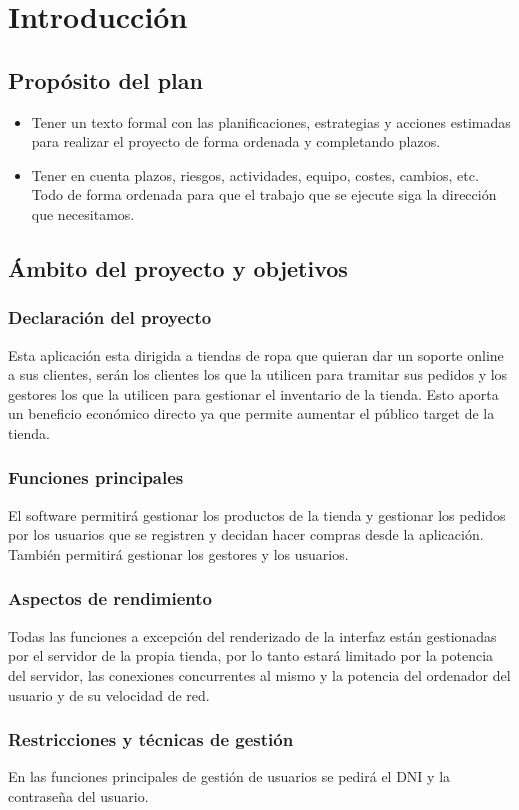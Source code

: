 \section{Introducción}
\subsection{Propósito del plan}
\begin{itemize}
	\item Tener un texto formal con las planificaciones, estrategias y acciones estimadas para realizar el proyecto de forma ordenada y completando plazos.
	\item Tener en cuenta plazos, riesgos, actividades, equipo, costes, cambios, etc. Todo de forma ordenada para que el trabajo que se ejecute siga la dirección que necesitamos.
\end{itemize}

\subsection{Ámbito del proyecto y objetivos}
\subsubsection{Declaración del proyecto}
Esta aplicación esta dirigida a tiendas de ropa que quieran dar un soporte online a sus clientes, serán los clientes los que la utilicen para tramitar sus pedidos y los gestores los que la utilicen para gestionar el inventario de la tienda. Esto aporta un beneficio económico directo ya que permite aumentar el público target de la tienda.
\subsubsection{Funciones principales}
El software permitirá gestionar los productos de la tienda y gestionar los pedidos por los usuarios que se registren y decidan hacer compras desde la aplicación. También permitirá gestionar los gestores y los usuarios.
\subsubsection{Aspectos de rendimiento}
Todas las funciones a excepción del renderizado de la interfaz están gestionadas por el servidor de la propia tienda, por lo tanto estará limitado por la potencia del servidor, las conexiones concurrentes al mismo y la potencia del ordenador del usuario y de su velocidad de red.
\subsubsection{Restricciones y técnicas de gestión}
En las funciones principales de gestión de usuarios se pedirá el DNI y la contraseña del usuario.


